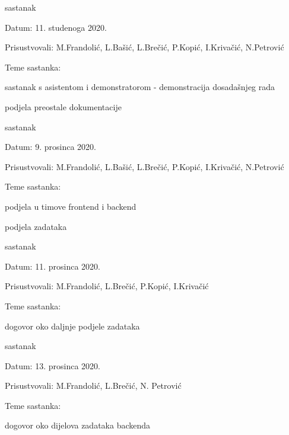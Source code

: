 \begin{packed_enum}
			\item sastanak
			\item[] \begin{packed_item}
				\item Datum: 11. studenoga 2020.
				\item Prisustvovali: M.Frandolić, L.Bašić, L.Brečić, P.Kopić, I.Krivačić, N.Petrović
				\item Teme sastanka:
				\begin{packed_item}
					\item sastanak s asistentom i demonstratorom - demonstracija dosadašnjeg rada
					\item podjela preostale dokumentacije
				\end{packed_item}
			\end{packed_item}
		
			\item sastanak
			\item[] \begin{packed_item}
				\item Datum: 9. prosinca 2020.
				\item Prisustvovali: M.Frandolić, L.Bašić, L.Brečić, P.Kopić, I.Krivačić, N.Petrović
				\item Teme sastanka:
				\begin{packed_item}
					\item podjela u timove frontend i backend
					\item podjela zadataka
				\end{packed_item}
			\end{packed_item}
			
			\item sastanak
			\item[] \begin{packed_item}
				\item Datum: 11. prosinca 2020.
				\item Prisustvovali: M.Frandolić, L.Brečić, P.Kopić, I.Krivačić
				\item Teme sastanka:
				\begin{packed_item}
					\item dogovor oko daljnje podjele zadataka
				\end{packed_item}
			\end{packed_item}
		
			\item sastanak
			\item[] \begin{packed_item}
				\item Datum: 13. prosinca 2020.
				\item Prisustvovali: M.Frandolić, L.Brečić, N. Petrović
				\item Teme sastanka:
				\begin{packed_item}
					\item dogovor oko dijelova zadataka backenda
				\end{packed_item}
			\end{packed_item}	
			

\end{packed_enum}
